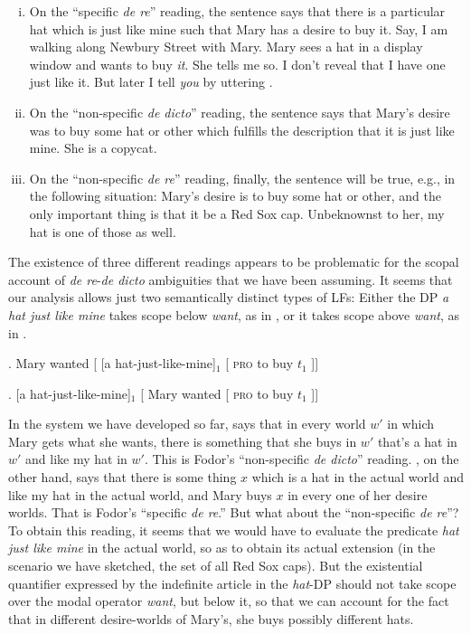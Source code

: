 \begin{enumerate}[(i)] 
	\item On the ``specific \emph{de re}'' reading, the sentence says that there is a particular hat which is just like mine such that Mary has a desire to buy it. Say, I am walking along Newbury Street with Mary. Mary sees a hat in a display window and wants to buy \emph{it}. She tells me so. I don't reveal that I have one just like it. But later I tell \emph{you} by uttering \Last. 
	\item On the ``non-specific \emph{de dicto}'' reading, the sentence says that Mary's desire was to buy some hat or other which fulfills the description that it is just like mine. She is a copycat. 
	\item On the ``non-specific \emph{de re}'' reading, finally, the sentence will be true, e.g., in the following situation: Mary's desire is to buy some hat or other, and the only important thing is that it be a Red Sox cap. Unbeknownst to her, my hat is one of those as well. 
\end{enumerate}
%
The existence of three different readings appears to be problematic for the scopal account of \emph{de re}-\emph{de dicto} ambiguities that we have been assuming. It seems that our analysis allows just two semantically distinct types of LFs: Either the DP \emph{a hat just like mine} takes scope below \emph{want}, as in \Next, or it takes scope above \emph{want}, as in \NNext.

\ex. Mary wanted [ [a hat-just-like-mine]$_{1}$ [ \textsc{pro} to buy $t_{1}$ ]]

\ex. [a hat-just-like-mine]$_{1}$ [ Mary wanted [ \textsc{pro} to buy $t_{1}$ ]]

In the system we have developed so far, \LLast says that in every world $w'$ in which Mary gets what she wants, there is something that she buys in $w'$ that's a hat in $w'$ and like my hat in $w'$. This is Fodor's ``non-specific \emph{de dicto}'' reading. \Last, on the other hand, says that there is some thing $x$ which is a hat in the actual world and like my hat in the actual world, and Mary buys $x$ in every one of her desire worlds. That is Fodor's ``specific \emph{de re}.'' But what about the ``non-specific \emph{de re}''? To obtain this reading, it seems that we would have to evaluate the predicate \emph{hat just like mine} in the actual world, so as to obtain its actual extension (in the scenario we have sketched, the set of all Red Sox caps). But the existential quantifier expressed by the indefinite article in the \emph{hat}-DP should not take scope over the modal operator \emph{want}, but below it, so that we can account for the fact that in different desire-worlds of Mary's, she buys possibly different hats.

